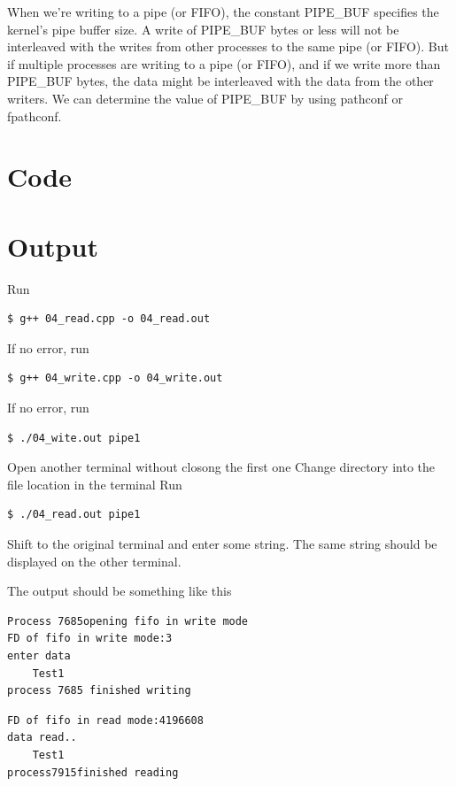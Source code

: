 \begin{description}
\item 
	When we're writing to a pipe (or FIFO), the constant PIPE\_BUF specifies the kernel's pipe buffer size. A write of PIPE\_BUF bytes or less will not be interleaved with the writes from other processes to the same pipe (or FIFO). But if multiple processes are writing to a pipe (or FIFO), and if we write more than PIPE\_BUF bytes, the data might be interleaved with the data from the other writers. We can determine the value of PIPE\_BUF by using pathconf or fpathconf.
\end{description}

\section{Code}




\section{Output}

Run
\begin{lstlisting}[style=shell-command]
$ g++ 04_read.cpp -o 04_read.out
\end{lstlisting}
If no error, run
\begin{lstlisting}[style=shell-command]
$ g++ 04_write.cpp -o 04_write.out
\end{lstlisting}
If no error, run
\begin{lstlisting}[style=shell-command]
$ ./04_wite.out pipe1
\end{lstlisting}

Open another terminal without closong the first one
Change directory into the file location in the terminal
Run
\begin{lstlisting}[style=shell-command]
$ ./04_read.out pipe1
\end{lstlisting}
Shift to the original terminal and enter some string.
The same string should be displayed on the other terminal.

The output should be something like this
\begin{lstlisting}[style=shell-output]
Process 7685opening fifo in write mode
FD of fifo in write mode:3
enter data
	Test1
process 7685 finished writing
\end{lstlisting}

\begin{lstlisting}[style=shell-output]
FD of fifo in read mode:4196608
data read..
	Test1
process7915finished reading
\end{lstlisting}


